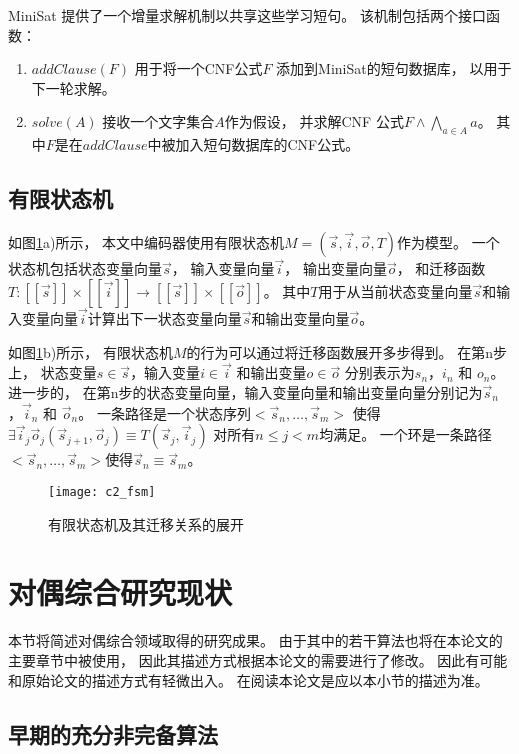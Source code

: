 MiniSat 提供了一个增量求解机制以共享这些学习短句。
该机制包括两个接口函数：
\begin{enumerate}
\item
$addClause(F)$ 用于将一个CNF公式$F$ 添加到MiniSat的短句数据库，
以用于下一轮求解。
\item
$solve(A)$ 接收一个文字集合$A$作为假设，
并求解CNF 公式$F\wedge \bigwedge_{a\in A} a$。
其中$F$是在$addClause$中被加入短句数据库的CNF公式。
\end{enumerate}


\subsection{有限状态机}\label{subsec_fsm}

如图\ref{c2_fsm}a)所示，
本文中编码器使用有限状态机$M=(\vec{s},\vec{i},\vec{o},T)$作为模型。
一个状态机包括状态变量向量$\vec{s}$，
输入变量向量$\vec{i}$，
输出变量向量$\vec{o}$，
和迁移函数$T: [\![\vec{s}]\!]\times [\![\vec{i}]\!]\to [\![\vec{s}]\!]\times [\![\vec{o}]\!]$。
其中$T$用于从当前状态变量向量$\vec{s}$和输入变量向量$\vec{i}$计算出下一状态变量向量$\vec{s}$和输出变量向量$\vec{o}$。

如图\ref{c2_fsm}b)所示，
有限状态机$M$的行为可以通过将迁移函数展开多步得到。
在第n步上，
状态变量$s\in\vec{s}$，输入变量$i\in\vec{i}$ 和输出变量$o\in\vec{o}$
分别表示为$s_n$，$i_n$ 和 $o_n$。
进一步的，
在第n步的状态变量向量，输入变量向量和输出变量向量分别记为$\vec{s}_n$，$\vec{i}_n$ 和 $\vec{o}_n$。
一条路径是一个状态序列$<\vec{s}_n,\dots,\vec{s}_m>$ 使得$\exists \vec{i}_j\vec{o}_j (\vec{s}_{j+1},\vec{o}_j)\equiv T(\vec{s}_j,\vec{i}_j)$ 对所有$n\le j< m$均满足。
一个环是一条路径$<\vec{s}_n,\dots,\vec{s}_m>$使得$\vec{s}_n\equiv \vec{s}_m$。

\begin{figure}[t]
  \centering
  \texttt{[image: c2\_fsm]}
  \caption{有限状态机及其迁移关系的展开}
  \label{c2_fsm}
\end{figure}


\section{对偶综合研究现状}\label{sec_now}
本节将简述对偶综合领域取得的研究成果。
由于其中的若干算法也将在本论文的主要章节中被使用，
因此其描述方式根据本论文的需要进行了修改。
因此有可能和原始论文的描述方式有轻微出入。
在阅读本论文是应以本小节的描述为准。

\subsection{早期的充分非完备算法}\label{subsec_sound}

